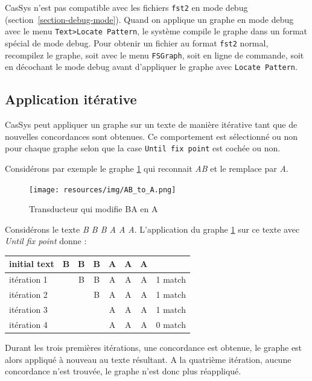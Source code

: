 \bigskip
\noindent CasSys n'est pas compatible avec les fichiers \verb+fst2+ en mode debug (section~\ref{section-debug-mode}).
Quand on applique un graphe en mode debug avec le menu \verb+Text>Locate Pattern+, le système
compile le graphe dans un format spécial de mode debug. Pour obtenir un fichier au format \verb+fst2+ normal,
recompilez le graphe, soit avec le menu \verb+FSGraph+, soit en ligne de commande, soit en décochant le mode
debug avant d'appliquer le graphe avec \verb+Locate Pattern+.

\subsection{Application itérative}
\label{sub:AppWhiCon}

CasSys peut appliquer un graphe sur un texte de manière itérative tant que de nouvelles concordances sont obtenues.
Ce comportement est sélectionné ou non pour chaque graphe selon que la case \verb+Until fix point+ est cochée ou non.

\bigskip
\noindent Considérons par exemple le graphe \ref{fig:AB->A} qui reconnait \emph{AB} et le remplace par \emph{A}.\\

\begin{figure}[!htbp]
  \centering
  \texttt{[image: resources/img/AB\_to\_A.png]}
  \caption{Transducteur qui modifie BA en A}
  \label{fig:AB->A}
\end{figure}

\bigskip
\noindent Considérons le texte \emph{B B B A A A}. L'application du graphe \ref{fig:AB->A} sur ce texte avec \emph{Until fix point}  donne :\\

\begin{tabular}{|l|cccccc|r|}
\hline
initial text  &B&B&B&A&A&A&\\
\hline
itération 1 & &B&B&A&A&A& 1 match\\
itération 2 & & &B&A&A&A& 1 match\\
itération 3 & & & &A&A&A& 1 match\\
itération 4 & & & &A&A&A& 0 match\\
\hline
\end{tabular}

\bigskip
\noindent Durant les trois premières itérations, une concordance est obtenue, le graphe
est alors appliqué à nouveau au texte résultant. A la quatrième itération, aucune
concordance n'est trouvée, le graphe n'est donc plus réappliqué.

